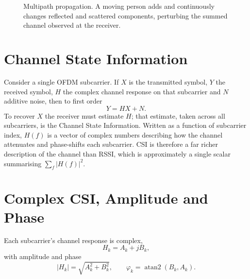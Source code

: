 \documentclass[11pt,a4paper,oneside]{report}
\begin{document}
\begin{figure}[H]
\centering
{}
\caption[Multipath propagation and human perturbation]{Multipath propagation. A
moving person adds and continuously changes reflected and scattered components,
perturbing the summed channel observed at the receiver.}
\label{fig:multipath}
\end{figure}

\section{Channel State Information}

Consider a single OFDM subcarrier. If $X$ is the transmitted symbol, $Y$ the
received symbol, $H$ the complex channel response on that subcarrier and $N$
additive noise, then to first order
\begin{equation}
  Y = H X + N .
  \label{eq:channel}
\end{equation}
To recover $X$ the receiver must estimate $H$; that estimate, taken across all
subcarriers, is the Channel State Information. Written as a function of
subcarrier index, $H(f)$ is a vector of complex numbers describing how the
channel attenuates and phase-shifts each subcarrier. CSI is therefore a far
richer description of the channel than RSSI, which is approximately a single
scalar summarising $\sum_f |H(f)|^2$.

\section{Complex CSI, Amplitude and Phase}

Each subcarrier's channel response is complex,
\begin{equation}
  H_k = A_k + j B_k ,
\end{equation}
with amplitude and phase
\begin{equation}
  |H_k| = \sqrt{A_k^2 + B_k^2}, \qquad
  \varphi_k = \operatorname{atan2}(B_k, A_k).
  \label{eq:amp}
\end{equation}
\end{document}
